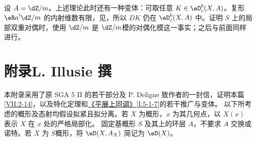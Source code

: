 \subsection{}\label{VII:4-7}
设 $A=\dZ/m$。上述理论此时还有一种变体：可取任意 $K\in\eD_c^b(X,A)$。复形 $\eR a^!\dZ/m$ 的内射维数有限，见\cite[XVIII 3.1.7]{sga4}，所以 $DK$ 仍在 $\eD_c^b(X,A)$ 中。证明 $S$ 上的局部双重对偶时，使用 $\dZ/m$ 是 $\dZ/m$模的对偶化模这一事实；之后与前面同样进行。

\section*{附录\quad L. Illusie 撰}\label{VII:5}
本附录采用了原 SGA 5 II 的若干部分及 P. Deligne 致作者的一封信，证明本篇\ref{VII:2-14}，以及特化定理\cite[XVI 2.1]{sga4}和\hyperref[I]{《平展上同调》}\ref{I:5-1-7}的若干推广与变体。
以下所考虑的概形及态射均假设拟紧且拟分离。若 $X$ 为概形，$x$ 为其几何点，以 $X(x)$ 表示 $X$ 在 $x$ 处的严格局部化。
固定基概形 $S$ 及其上的环层 $A$，不要求 $A$ 交换或诺特。若 $X$ 为 $S$概形，将 $\eD(X,A_X)$ 简记为 $\eD(X)$。
\setcounter{section}{0}
